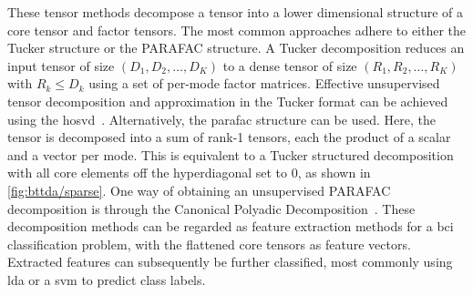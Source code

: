 \documentclass[twocolumn]{article}
\begin{document}
These tensor methods decompose a tensor into a lower dimensional structure of a
core tensor and factor tensors.
The most common approaches adhere to either the Tucker structure or the PARAFAC
structure.
A Tucker decomposition reduces an input tensor of size $(D_1,D_2,\ldots,D_K)$ to
a dense tensor of size $(R_1,R_2,\ldots,R_K)$ with $R_k \leq D_k$ using a
set of per-mode factor matrices.
Effective unsupervised tensor decomposition and approximation in the Tucker format can be achieved
using the \ac{hosvd}~\cite{DeLathauwer2000,SoleCasals2018}.
Alternatively, the \ac{parafac} structure can be used.
Here, the tensor is decomposed into a sum of rank-1 tensors, each the product
of a scalar and a vector per mode.
This is equivalent to a Tucker structured decomposition with all core elements
off the hyperdiagonal set to 0, as shown in \cref{fig:bttda/sparse}.
One way of obtaining an unsupervised PARAFAC decomposition is through the Canonical Polyadic
Decomposition~\cite{Hitchcock1927,Nazarpour2006}.
These decomposition methods can be regarded as feature extraction methods for a
\ac{bci} classification problem, with the flattened core tensors as feature vectors.
Extracted features can subsequently be further classified, most commonly
using \ac{lda} or a \ac{svm} to predict class labels.


\end{document}
